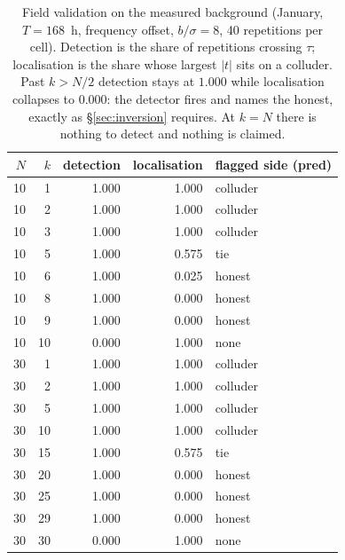 \begin{table}[t]
\centering
\caption{Field validation on the measured background (January, $T=168$~h, frequency offset, $b/\sigma=8$, 40 repetitions per cell). Detection is the share of repetitions crossing $\tau$; localisation is the share whose largest $|t|$ sits on a colluder. Past $k>N/2$ detection stays at $1.000$ while localisation collapses to $0.000$: the detector fires and names the honest, exactly as \S\ref{sec:inversion} requires. At $k=N$ there is nothing to detect and nothing is claimed.}
\label{tab:field}
\small
\begin{tabular}{@{}r r r r l@{}}
\toprule
$N$ & $k$ & detection & localisation & flagged side (pred) \\
\midrule
10 & 1 & 1.000 & 1.000 & colluder \\
10 & 2 & 1.000 & 1.000 & colluder \\
10 & 3 & 1.000 & 1.000 & colluder \\
10 & 5 & 1.000 & 0.575 & tie \\
10 & 6 & 1.000 & 0.025 & honest \\
10 & 8 & 1.000 & 0.000 & honest \\
10 & 9 & 1.000 & 0.000 & honest \\
10 & 10 & 0.000 & 1.000 & none \\
30 & 1 & 1.000 & 1.000 & colluder \\
30 & 2 & 1.000 & 1.000 & colluder \\
30 & 5 & 1.000 & 1.000 & colluder \\
30 & 10 & 1.000 & 1.000 & colluder \\
30 & 15 & 1.000 & 0.575 & tie \\
30 & 20 & 1.000 & 0.000 & honest \\
30 & 25 & 1.000 & 0.000 & honest \\
30 & 29 & 1.000 & 0.000 & honest \\
30 & 30 & 0.000 & 1.000 & none \\
\bottomrule
\end{tabular}
\end{table}
